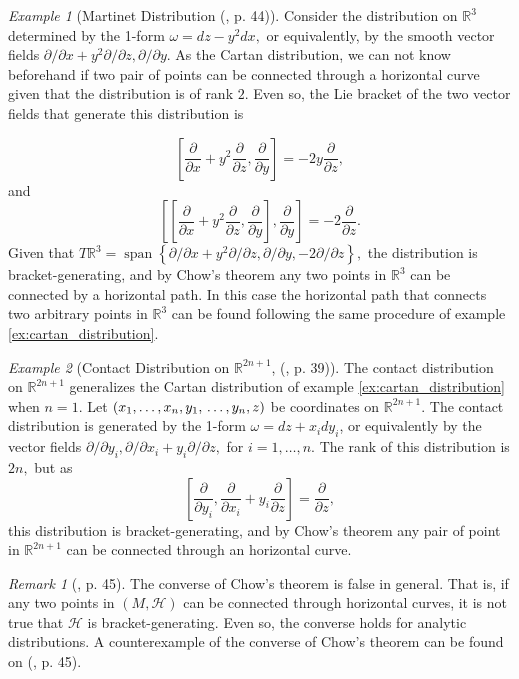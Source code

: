 \documentclass[12pt, letterpaper, reqno]{amsart}
\theoremstyle{definition}
\theoremstyle{plain}
\theoremstyle{remark}
\newtheorem{ex}{Example}
\newtheorem{rem}{Remark}
\begin{document}
\begin{ex}[Martinet Distribution (\cite{montgomery2002tour}, p. 44)]
	Consider the distribution on $ \mathbb{R}^3 $ determined by the 1-form $ \omega = dz-y^2dx, $ or equivalently, by the smooth vector fields $ \partial/\partial x+y^2\partial/\partial z, \partial/\partial y $. As the Cartan distribution, we can not know beforehand if two pair of points can be connected through a horizontal curve given that the distribution is of rank $ 2. $ Even so, the Lie bracket of the two vector fields that generate this distribution is  

	$$ \left[ \frac{\partial }{\partial x} + y^2 \frac{\partial }{\partial z} , \frac{\partial }{\partial y}  \right] =-2y \frac{\partial }{\partial z}, $$ 
	and 
	$$ \left[\left[ \frac{\partial }{\partial x} + y^2 \frac{\partial }{\partial z} , \frac{\partial }{\partial y}  \right], \frac{\partial }{\partial y} \right] = -2 \frac{\partial }{\partial z}.  $$ 
	Given that $ T \mathbb{R}^3 = \operatorname{span} \left\{ \partial/\partial x+ y^2\partial/\partial z, \partial/\partial y, -2\partial/\partial z \right\},  $ the distribution is bracket-generating, and by Chow's theorem any two points in $ \mathbb{R}^3 $ can be connected by a horizontal path. In this case the horizontal path that connects two arbitrary points in $ \mathbb{R}^3 $ can be found following the same procedure of example \ref{ex:cartan_distribution}.
\end{ex}

\begin{ex}[Contact Distribution on $ \mathbb{R}^{2n+1} $, (\cite{montgomery2002tour}, p. 39)]
	The contact distribution on $ \mathbb{R}^{2n+1} $ generalizes the Cartan distribution of example \ref{ex:cartan_distribution} when $ n=1 $. Let $ (x_1,\dots,x_n,y_1,\\\dots, y_n,z) $ be coordinates on $ \mathbb{R}^{2n+1} $. The contact distribution is generated by the 1-form $ \omega = dz+ x_i dy_i$, or equivalently by the vector fields $ \partial/ \partial y_i, \partial/ \partial x_i+ y_i \partial/\partial z, $ for $ i=1,\dots, n. $ The rank of this distribution is $ 2n, $ but as 
	$$ \left[ \frac{\partial }{\partial y_i} , \frac{\partial }{\partial x_i} + y_i \frac{\partial }{\partial z}  \right] = \frac{\partial }{\partial z},  $$ 
	this distribution is bracket-generating, and by Chow's theorem any pair of point in $ \mathbb{R}^{2n+1} $ can be connected through an horizontal curve.
\end{ex}

\begin{rem}[\cite{montgomery2002tour}, p. 45]
	The converse of Chow's theorem is false in general. That is, if any two points in $ (M,\mathcal{H}) $ can be connected through horizontal curves, it is not true that $ \mathcal{H} $ is bracket-generating. Even so, the converse holds for analytic distributions. A counterexample of  the converse of Chow's theorem can be found on (\cite{montgomery2002tour}, p. 45).
\end{rem}
\end{document}
